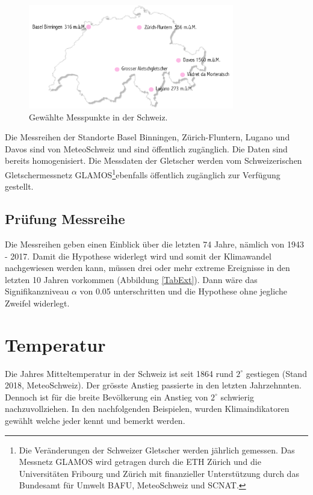 \begin{refsection}
\begin{figure}[htbp]
\centering
\includegraphics[width=0.8\textwidth]{extrem/Schweiz.pdf}
\caption{Gewählte Messpunkte in der Schweiz.}
\label{MesspunkteSchweiz}
\end{figure}

Die Messreihen der Standorte Basel Binningen, Zürich-Fluntern, Lugano und Davos sind von MeteoSchweiz und sind öffentlich zugänglich. Die Daten sind bereits homogenisiert.
Die Messdaten der Gletscher werden vom Schweizerischen Gletschermessnetz GLAMOS\footnote{%
Die Veränderungen der Schweizer Gletscher werden jährlich gemessen. Das Messnetz GLAMOS wird getragen durch die ETH Zürich und die Universitäten Fribourg und Zürich mit finanzieller Unterstützung durch das Bundesamt für Umwelt BAFU, MeteoSchweiz und SCNAT.}ebenfalls öffentlich zugänglich zur Verfügung gestellt.


\subsection{Prüfung Messreihe}
Die Messreihen geben einen Einblick über die letzten 74 Jahre, nämlich von 1943 - 2017. Damit die Hypothese widerlegt wird und somit der Klimawandel nachgewiesen werden kann, müssen drei oder mehr extreme Ereignisse in den letzten 10 Jahren vorkommen (Abbildung \ref{TabExt}). Dann wäre das Signifikanzniveau $\alpha$ von 0.05 unterschritten und die Hypothese ohne jegliche Zweifel widerlegt.


\section{Temperatur}
Die Jahres Mitteltemperatur in der Schweiz ist seit 1864 rund $2^{\circ}$ gestiegen (Stand 2018, MeteoSchweiz). Der grösste Anstieg passierte in den letzten Jahrzehnnten. Dennoch ist für die breite Bevölkerung ein Anstieg von $2^{\circ}$ schwierig nachzuvollziehen.
In den nachfolgenden Beispielen, wurden Klimaindikatoren gewählt welche jeder kennt und bemerkt werden.


\end{refsection}
